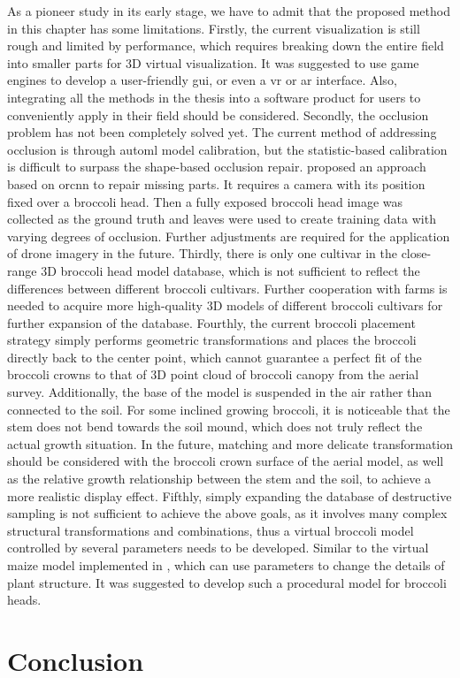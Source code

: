 As a pioneer study in its early stage, we have to admit that the proposed method in this chapter has some limitations. 
Firstly, the current visualization is still rough and limited by performance, which requires breaking down the entire field into smaller parts for 3D virtual visualization. It was suggested to use game engines to develop a user-friendly \gls{gui}, or even a \gls{vr} or \gls{ar} interface. Also, integrating all the methods in the thesis into a software product for users to conveniently apply in their field should be considered. 
Secondly, the occlusion problem has not been completely solved yet. The current method of addressing occlusion is through \gls{automl} model calibration, but the statistic-based calibration is difficult to surpass the shape-based occlusion repair. \citet{blok_image_2021} proposed an approach based on \gls{orcnn} to repair missing parts. It requires a camera with its position fixed over a broccoli head. Then a fully exposed broccoli head image was collected as the ground truth and leaves were used to create training data with varying degrees of occlusion. Further adjustments are required for the application of drone imagery in the future. 
Thirdly, there is only one cultivar in the close-range 3D broccoli head model database, which is not sufficient to reflect the differences between different broccoli cultivars. Further cooperation with farms is needed to acquire more high-quality 3D models of different broccoli cultivars for further expansion of the database. 
Fourthly, the current broccoli placement strategy simply performs geometric transformations and places the broccoli directly back to the center point, which cannot guarantee a perfect fit of the broccoli crowns to that of 3D point cloud of broccoli canopy from the aerial survey. Additionally, the base of the model is suspended in the air rather than connected to the soil. For some inclined growing broccoli, it is noticeable that the stem does not bend towards the soil mound, which does not truly reflect the actual growth situation. In the future, matching and more delicate transformation should be considered with the broccoli crown surface of the aerial model, as well as the relative growth relationship between the stem and the soil, to achieve a more realistic display effect.
Fifthly, simply expanding the database of destructive sampling is not sufficient to achieve the above goals, as it involves many complex structural transformations and combinations, thus a  virtual broccoli model controlled by several parameters needs to be developed. Similar to the virtual maize model implemented in \citet{cieslak_l-system_2021}, which can use parameters to change the details of plant structure. It was suggested to develop such a procedural model for broccoli heads. 

\section{Conclusion}